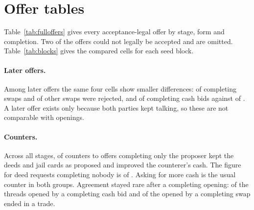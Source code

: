 \section{Offer tables}
\label{app:offers}

Table~\ref{tab:fulloffers} gives every acceptance-legal offer by stage, form and completion. Two of the  offers could not legally be accepted and are omitted. Table~\ref{tab:blocks} gives the compared cells for each seed block.

\begin{table}[ht]\centering\small
\TableFullOffers
\caption{All  acceptance-legal offers. Cells show offers (accepted/countered/rejected). Later offers are counters within a thread.}
\label{tab:fulloffers}\end{table}

\begin{table}[ht]\centering\small
\TableBlocks
\caption{The compared opening cells and the unlisted-collateral debts, by seed block. Each block is four games with one seed and four seat rotations.}
\label{tab:blocks}\end{table}

\paragraph{Later offers.}
Among later offers the same four cells show smaller differences:  of  completing swaps and  of  other swaps were rejected, and  of  completing cash bids against  of . A later offer exists only because both parties kept talking, so these are not comparable with openings.

\paragraph{Counters.}
Across all stages,  of  counters to offers completing only the proposer kept the deeds and jail cards as proposed and improved the counterer's cash. The figure for deed requests completing nobody is  of . Asking for more cash is the usual counter in both groups. Agreement stayed rare after a completing opening:  of the  threads opened by a completing cash bid and  of the  opened by a completing swap ended in a trade.

